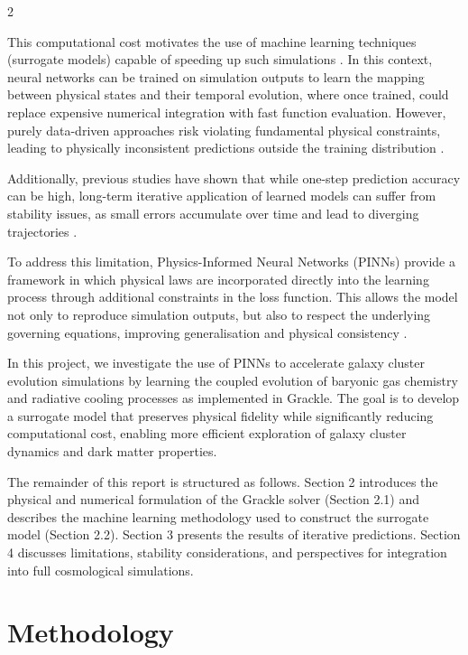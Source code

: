 \documentclass[10pt,a4paper]{article}
\begin{document}
\begin{multicols}{2}


This computational cost motivates the use of machine learning techniques (surrogate models) capable of speeding up such simulations \cite{harvey2024deep}. In this context, neural networks can be trained on simulation outputs to learn the mapping between physical states and their temporal evolution, where once trained, could replace expensive numerical integration with fast function evaluation. However, purely data-driven approaches risk violating fundamental physical constraints, leading to physically inconsistent predictions outside the training distribution \cite{raissi2019physicsinformed}.

Additionally, previous studies have shown that while one-step prediction accuracy can be high, long-term iterative application of learned models can suffer from stability issues, as small errors accumulate over time and lead to diverging trajectories \cite{bourrat2026}.

To address this limitation, Physics-Informed Neural Networks (PINNs) provide a framework in which physical laws are incorporated directly into the learning process through additional constraints in the loss function. This allows the model not only to reproduce simulation outputs, but also to respect the underlying governing equations, improving generalisation and physical consistency \cite{raissi2019physicsinformed}.

In this project, we investigate the use of PINNs to accelerate galaxy cluster evolution simulations by learning the coupled evolution of baryonic gas chemistry and radiative cooling processes as implemented in Grackle. The goal is to develop a surrogate model that preserves physical fidelity while significantly reducing computational cost, enabling more efficient exploration of galaxy cluster dynamics and dark matter properties.

The remainder of this report is structured as follows. Section 2 introduces the physical and numerical formulation of the Grackle solver (Section 2.1) and describes the machine learning methodology used to construct the surrogate model (Section 2.2). Section 3 presents the results of iterative predictions. Section 4 discusses limitations, stability considerations, and perspectives for integration into full cosmological simulations.


\section{Methodology}

\end{multicols}
\end{document}
